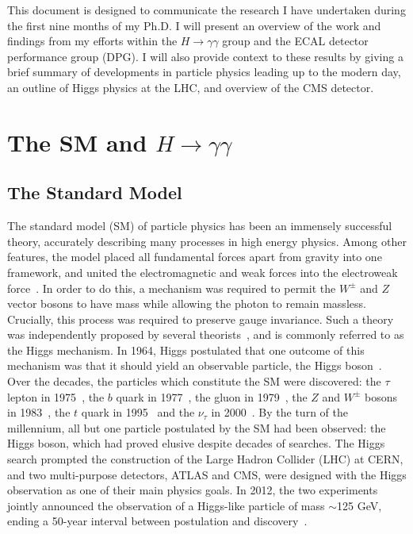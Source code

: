 \documentclass[10pt]{article}
\begin{document}
 This document is designed to communicate the research I have undertaken during the first nine months of my Ph.D. I will present an overview of the work and findings from my efforts within the $H \rightarrow \gamma \gamma$ group and the ECAL detector performance group (DPG). I will also provide context to these results by giving a brief summary of developments in particle physics leading up to the modern day, an outline of Higgs physics at the LHC, and overview of the CMS detector.
\newpage 

\section{The SM and $H \rightarrow \gamma \gamma$}

\subsection{The Standard Model}


The standard model (SM) of particle physics has been an immensely successful theory, accurately describing many processes in high energy physics. %
Among other features, the model placed all fundamental forces apart from gravity into one framework, and united the electromagnetic and weak forces into the electroweak force~\cite{GIM,Salam,Weinberg}. In order to do this, a mechanism was required to permit the $W^{\pm}$ and $Z$ vector bosons to have mass while allowing the photon to remain massless. Crucially, this process was required to preserve gauge invariance. Such a theory was independently proposed by several theorists~\cite{BroutEnglert,Higgs1,Higgs2,Kibble1,Higgs3,Kibble2}, and is commonly referred to as the Higgs mechanism. In 1964, Higgs postulated that one outcome of this mechanism was that it should yield an observable particle, the Higgs boson~\cite{Higgs2}. Over the decades, the particles which constitute the SM were discovered: the $\tau$ lepton in 1975~\cite{tauDisc}, the $b$ quark in 1977~\cite{bquarkDisc}, the gluon in 1979~\cite{Gluon1,Gluon2,Gluon3}, the $Z$ and $W^{\pm}$ bosons in 1983~\cite{ZDisc,WDisc}, the $t$ quark in 1995~\cite{tquarkDisc1,tquarkDisc2} and the $\nu_{\tau}$ in 2000~\cite{TauNuDisc}. By the turn of the millennium, all but one particle postulated by the SM had been observed: the Higgs boson, which had proved elusive despite decades of searches. The Higgs search prompted the construction of the Large Hadron Collider (LHC) at CERN, and two multi-purpose detectors, ATLAS and CMS, were designed with the Higgs observation as one of their main physics goals. In 2012, the two experiments jointly announced the observation of a Higgs-like particle of mass $\sim$125 GeV, ending a 50-year interval between postulation and discovery~\cite{CMSHDisc,ATLASHDisc}.
\end{document}
